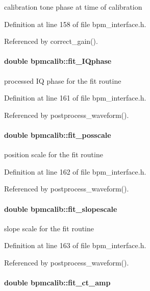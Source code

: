 calibration tone phase at time of calibration 

Definition at line 158 of file bpm\_\-interface.h.

Referenced by correct\_\-gain().
\paragraph[fit\_\-IQphase]{\setlength{\rightskip}{0pt plus 5cm}double {\bf bpmcalib::fit\_\-IQphase}}\hfill\label{structbpmcalib_de251f1e43e5d631283b36086916b5d8}


processed IQ phase for the fit routine 

Definition at line 161 of file bpm\_\-interface.h.

Referenced by postprocess\_\-waveform().
\paragraph[fit\_\-posscale]{\setlength{\rightskip}{0pt plus 5cm}double {\bf bpmcalib::fit\_\-posscale}}\hfill\label{structbpmcalib_ce7dcc20bcfdf83fa642cf8ef5be273c}


position scale for the fit routine 

Definition at line 162 of file bpm\_\-interface.h.

Referenced by postprocess\_\-waveform().
\paragraph[fit\_\-slopescale]{\setlength{\rightskip}{0pt plus 5cm}double {\bf bpmcalib::fit\_\-slopescale}}\hfill\label{structbpmcalib_8f4b5713433ab66b44a6f6a60ca7c64d}


slope scale for the fit routine 

Definition at line 163 of file bpm\_\-interface.h.

Referenced by postprocess\_\-waveform().
\paragraph[fit\_\-ct\_\-amp]{\setlength{\rightskip}{0pt plus 5cm}double {\bf bpmcalib::fit\_\-ct\_\-amp}}\hfill\label{structbpmcalib_36b8871b5f00e1aadf0e78b0a2dca1ef}


